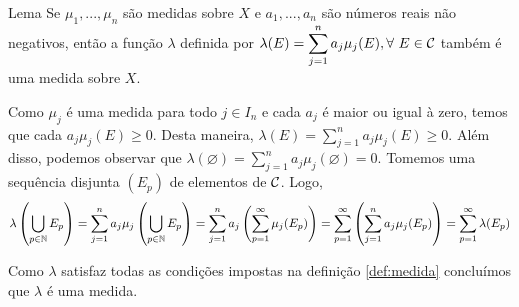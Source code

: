 \begin{env}{Lema}
	\label{lem:medida-gerada-por-medidas-e-numeros-reais}
	Se $\mu_1, ..., \mu_n$ são medidas sobre $X$ e $a_1, ... , a_n$ são números reais não negativos, então a função $\lambda$ definida por
	$\lambda(E) = \displaystyle \sum_{j =1}^n a_j\mu_j(E), \forall\  E \in \operatorname{\mathcal{C}}$ também é uma medida sobre $X$.
\end{env}
\begin{prova}
	Como $\mu_j$ é uma medida para todo $j \in I_n$ e cada $a_j$ é maior ou igual à zero, temos que cada $a_j\mu_j(E) \geq 0$.
	Desta maneira, $\lambda(E) = \displaystyle \sum_{j = 1}^n a_j\mu_j(E) \geq 0$.
	Além disso, podemos observar que $\lambda(\varnothing) = \displaystyle \sum_{j =1}^n a_j\mu_j(\varnothing) = 0$.
	Tomemos uma sequência disjunta $(E_p)$ de elementos de $\operatorname{\mathcal{C}}$.
	Logo, 
	$$
	\lambda\left(\bigcup_{p \in \operatorname{\mathbb{N}}} E_p\right)
	=
	\sum_{j = 1}^n a_j\mu_j\left(\bigcup_{p \in \operatorname{\mathbb{N}}} E_p\right)
	=
	\sum_{j = 1}^n a_j\left(\sum_{p = 1}^\infty\mu_j(E_p)\right)
	=
	\sum_{p = 1}^\infty\left(\sum_{j = 1}^na_j\mu_j(E_p)\right)
	=
	\sum_{p = 1}^{\infty}\lambda(E_p)
	$$
	\begin{comment}
	Afirmamos que $\displaystyle \sum_{j = 1}^n a_j\left(\sum_{p = 1}^\infty\mu_j(E_p)\right) = \sum_{p = 1}^\infty\left(\sum_{j = 1}^na_j\mu_j(E_p)\right)$.
	Com efeito, 
	\begin{align*}
	\sum_{j = 1}^n a_j\left(\sum_{p = 1}^\infty\mu_j(E_p)\right)
	= &
	\sum_{j = 1}^n a_j\left(\lim_{m \to +\infty}\sum_{p = 1}^m\mu_j(E_p)\right)\\
	= &
	\lim_{m \to +\infty}\left[\sum_{j = 1}^n a_j\left(\sum_{p = 1}^m\mu_j(E_p)\right)\right]\\
	= &
	\lim_{m \to +\infty}\left[a_1\left(\sum_{p = 1}^m\mu_1(E_p)\right)+ \cdots + a_n\left(\sum_{p = 1}^m\mu_n(E_p)\right)\right]\\
	= &
	\lim_{m \to +\infty}\left(\sum_{p = 1}^ma_1\mu_1(E_p)+ \cdots + \sum_{p = 1}^ma_n\mu_n(E_p)\right)\\
	= &
	\lim_{m \to +\infty}\sum_{p = 1}^m \left(a_1\mu_1(E_p)+ \cdots + a_n\mu_n(E_p)\right)\\
	= &
	\lim_{m \to +\infty}\sum_{p = 1}^m \left(\sum_{j = 1}^na_j\mu_j(E_p)\right)\\
	= &
	\sum_{p = 1}^\infty \left(\sum_{j = 1}^na_j\mu_j(E_p)\right)\\
\end{align*}		
	\end{comment}
	
\begin{comment}
		Disso tudo, obtemos que 
	$$
	\lambda\left(\bigcup_{p \in \N} E_p\right)
	=
	\sum_{j = 1}^n a_j\left(\sum_{p = 1}^\infty\mu_j(E_p)\right)
	=
	\sum_{p = 1}^\infty \left(\sum_{j = 1}^na_j\mu_j(E_p)\right)
	=
	\sum_{p = 1}^\infty \lambda(E_p)
	$$
\end{comment}

	Como $\lambda$ satisfaz todas as condições impostas na definição \ref{def:medida} concluímos que $\lambda$ é uma medida.    
\end{prova}

